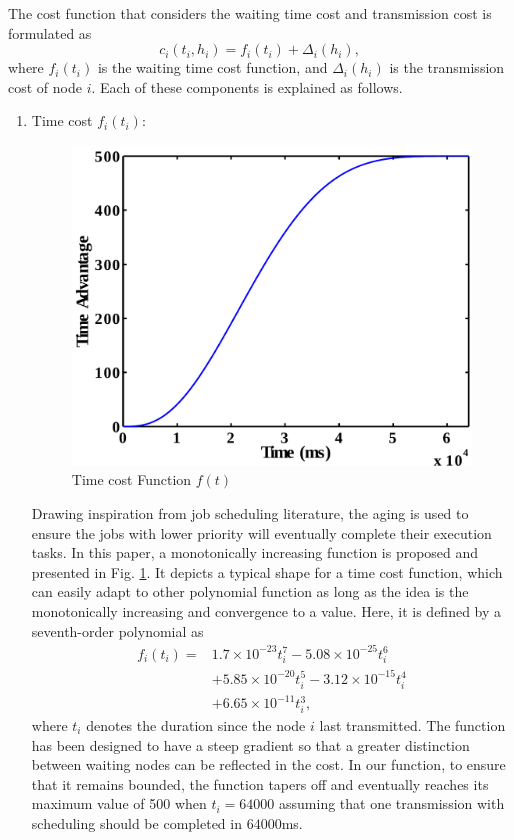\documentclass[journal]{IEEEtran}  %
\begin{document}
The cost function that considers the waiting time cost and transmission cost 
is formulated as 
\begin{equation}
c_i(t_i,h_i) = f_i(t_i) + \Delta_i(h_i),  %
\label{equ:cost}
\end{equation}
where $f_i(t_i)$ is the waiting time cost function, and $\Delta_i(h_i)$ is the
transmission cost of node $i$.
Each of these components is explained as follows. 
\begin{enumerate}
\item{Time cost $f_i(t_i)$:}

\begin{figure}
\centering
\includegraphics[width=0.7\columnwidth]{Tex_Picts/MATLAB_Figs/aging_func.pdf} 
\caption{Time cost Function $f(t)$}
\label{fig:time_advantage_func}
\end{figure}
Drawing inspiration from job scheduling literature, the aging
\cite{Rudek2012aging} is used to ensure the jobs with lower priority will
eventually complete their execution tasks. 
In this paper, a monotonically increasing function is proposed and
presented in Fig. \ref{fig:time_advantage_func}.
It depicts a typical shape for a time cost function, which can easily adapt to
other polynomial function as long as the idea is the monotonically increasing
and convergence to a value. 
Here, it is defined by a seventh-order polynomial as 
\begin{equation}
\begin{aligned}
f_i(t_i) = &1.7\times10^{-23}t_i^7-5.08\times10^{-25}t_i^6 \\
           &+5.85\times10^{-20}t_i^5 -3.12\times10^{-15}t_i^4 \\
           &+6.65\times10^{-11}t_i^3,
\end{aligned}
\end{equation}
where $t_i$ denotes the duration since the node $i$ last transmitted. 
The function has been designed to have a steep gradient so that a greater
distinction between waiting nodes can be reflected in the cost. %
In our function, to ensure that it remains bounded, the function tapers off and
eventually reaches its maximum value of 500 when $t_i = 64000$ assuming that 
one transmission with scheduling should be completed in $64000$ms.


\end{enumerate}
\end{document}
